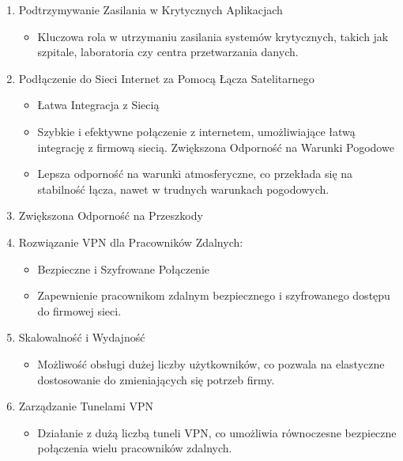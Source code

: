 \begin{enumerate}
            \item Podtrzymywanie Zasilania w Krytycznych Aplikacjach
            \begin{itemize}
                \item Kluczowa rola w utrzymaniu zasilania systemów krytycznych, takich jak szpitale, laboratoria czy
                centra przetwarzania danych.
            \end{itemize}




         \item Podłączenie do Sieci Internet za Pomocą Łącza Satelitarnego
            \begin{itemize}
                \item Łatwa Integracja z Siecią
                \item Szybkie i efektywne połączenie z internetem, umożliwiające łatwą integrację z firmową siecią.
                Zwiększona Odporność na Warunki Pogodowe
                \item Lepsza odporność na warunki atmosferyczne, co przekłada się na stabilność łącza, nawet w trudnych
                warunkach pogodowych.
            \end{itemize}


        \item Zwiększona Odporność na Przeszkody
        
        \item Rozwiązanie VPN dla Pracowników Zdalnych:
        \begin{itemize}
            \item Bezpieczne i Szyfrowane Połączenie
            \item Zapewnienie pracownikom zdalnym bezpiecznego i szyfrowanego dostępu do firmowej sieci.
        \end{itemize}

        \item Skalowalność i Wydajność
        \begin{itemize}
            \item Możliwość obsługi dużej liczby użytkowników, co pozwala na elastyczne dostosowanie do
            zmieniających się potrzeb firmy.
        \end{itemize}

        \item Zarządzanie Tunelami VPN
        \begin{itemize}
            \item Działanie z dużą liczbą tuneli VPN, co umożliwia równoczesne bezpieczne połączenia wielu
            pracowników zdalnych.
        \end{itemize}


\end{enumerate}
